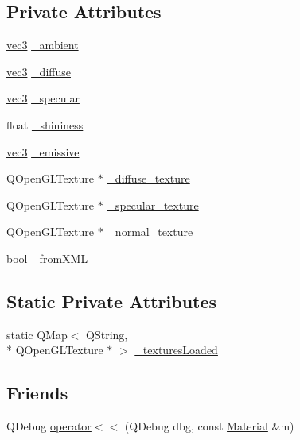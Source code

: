 \subsection*{Private Attributes}
\begin{DoxyCompactItemize}
\item 
\hyperlink{structvec3}{vec3} \hyperlink{class_material_a4c29044a3f7e8008eb3a0666c4ce09b9}{\+\_\+ambient}
\item 
\hyperlink{structvec3}{vec3} \hyperlink{class_material_a402005729d7d5a147d51dfcd691d2ffa}{\+\_\+diffuse}
\item 
\hyperlink{structvec3}{vec3} \hyperlink{class_material_af3e2839f5a712fba28111e00783af70f}{\+\_\+specular}
\item 
float \hyperlink{class_material_ae3f666b9de93b770232ebb5b1b3ee47e}{\+\_\+shininess}
\item 
\hyperlink{structvec3}{vec3} \hyperlink{class_material_a7c2eb5e499b3f46ec6e9d62f02653879}{\+\_\+emissive}
\item 
Q\+Open\+G\+L\+Texture $\ast$ \hyperlink{class_material_a522d07896a1363e987d09d8e4b66c156}{\+\_\+diffuse\+\_\+texture}
\item 
Q\+Open\+G\+L\+Texture $\ast$ \hyperlink{class_material_a15711d6d794b6ea122e38738fa73ba8a}{\+\_\+specular\+\_\+texture}
\item 
Q\+Open\+G\+L\+Texture $\ast$ \hyperlink{class_material_add78622071d92485dd37dbd1934453b3}{\+\_\+normal\+\_\+texture}
\item 
bool \hyperlink{class_material_a3a262cfbb40e19f79b29c61386e76f95}{\+\_\+from\+X\+M\+L}
\end{DoxyCompactItemize}
\subsection*{Static Private Attributes}
\begin{DoxyCompactItemize}
\item 
static Q\+Map$<$ Q\+String, \\*
Q\+Open\+G\+L\+Texture $\ast$ $>$ \hyperlink{class_material_a9f91b9fda835fed049df5c6959043623}{\+\_\+textures\+Loaded}
\end{DoxyCompactItemize}
\subsection*{Friends}
\begin{DoxyCompactItemize}
\item 
Q\+Debug \hyperlink{class_material_a6796ee577479f67459444fcd552e6c05}{operator$<$$<$} (Q\+Debug dbg, const \hyperlink{class_material}{Material} \&m)
\end{DoxyCompactItemize}


